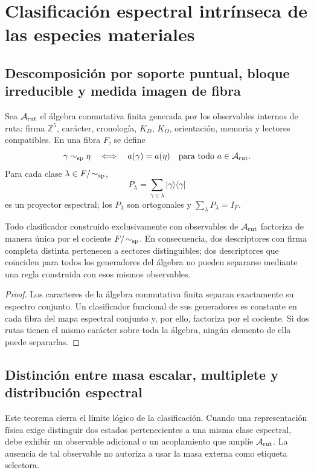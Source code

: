 \section{Clasificación espectral intrínseca de las especies materiales}

\subsection{Descomposición por soporte puntual, bloque irreducible y medida imagen de fibra}

Sea \(\mathcal A_{\rm rut}\) el álgebra conmutativa finita generada por los
observables internos de ruta: firma \(\mathbb Z^5\), carácter, cronología,
\(K_D\), \(K_\Omega\), orientación, memoria y lectores compatibles. En una
fibra \(F\), se define
\[
 \gamma\sim_{\rm sp}\eta
 \quad\Longleftrightarrow\quad
 a(\gamma)=a(\eta)\quad\text{para todo }a\in\mathcal A_{\rm rut}.
\]
Para cada clase \(\lambda\in F/\!\sim_{\rm sp}\),
\[
 P_\lambda=\sum_{\gamma\in\lambda}
 |\gamma\rangle\langle\gamma|
\]
es un proyector espectral; los \(P_\lambda\) son ortogonales y
\(\sum_\lambda P_\lambda=I_F\).

\begin{theorem}
Todo clasificador construido exclusivamente con observables de
\(\mathcal A_{\rm rut}\) factoriza de manera única por el cociente
\(F/\!\sim_{\rm sp}\). En consecuencia, dos descriptores con firma completa
distinta pertenecen a sectores distinguibles; dos descriptores que coinciden
para todos los generadores del álgebra no pueden separarse mediante una regla
construida con esos mismos observables.
\end{theorem}

\begin{proof}
Los caracteres de la álgebra conmutativa finita separan exactamente su
espectro conjunto. Un clasificador funcional de sus generadores es constante
en cada fibra del mapa espectral conjunto y, por ello, factoriza por el
cociente. Si dos rutas tienen el mismo carácter sobre toda la álgebra, ningún
elemento de ella puede separarlas.
\end{proof}

\subsection{Distinción entre masa escalar, multiplete y distribución espectral}

Este teorema cierra el límite lógico de la clasificación. Cuando una
representación física exige distinguir dos estados pertenecientes a una misma
clase espectral, debe exhibir un observable adicional o un acoplamiento que
amplíe \(\mathcal A_{\rm rut}\). La ausencia de tal observable no autoriza a
usar la masa externa como etiqueta selectora.

